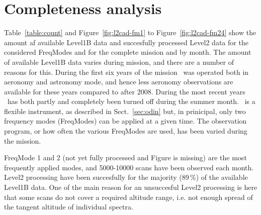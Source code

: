\chapter{Completeness analysis}
\label{chapter:cad}

\begin{table}
\caption{ \smr\ Level1B and Level2 data count by frequency mode.}
\label{table:count}
\end{table}


Table~\ref{table:count} and Figure~\ref{fig:l2cad-fm1} to Figure~\ref{fig:l2cad-fm24}
show the amount af available Level1B data and succesfully
processed Level2 data for the considered FreqModes and
for the complete mission and by month.
The amount of available Level1B data varies during mission,
and there are a number of reasons for this.
During the first six years of the mission \smr\ was operated
both in aeronomy and astronomy mode, and hence less
aeronomy observations are available for these years
compared to after 2008.  
During the most recent years \smr\ has both partly and completely
been turned off during the summer month.
\smr\ is a flexible instrument, as described in Sect.~\ref{sec:odin}
but, in prinicipal, only two frequency modes (FreqModes)
can be applied at a given time. The observation program, or how
often the various FreqModes are used, has been varied during the
mission.

FreqMode 1 and 2 (not yet fully processed and Figure is missing)
are the most frequently applied modes, and 5000-10000 scans have been
observed each month. Level2 processing have been succesfully
for the majority (89\,\%) of the available Level1B data.
One of the main reason for an unsuccesful Level2 processing is here
that some scans do not cover a required altitude range, 
i.e. not enough spread of the tangent altitude of individual spectra. 

